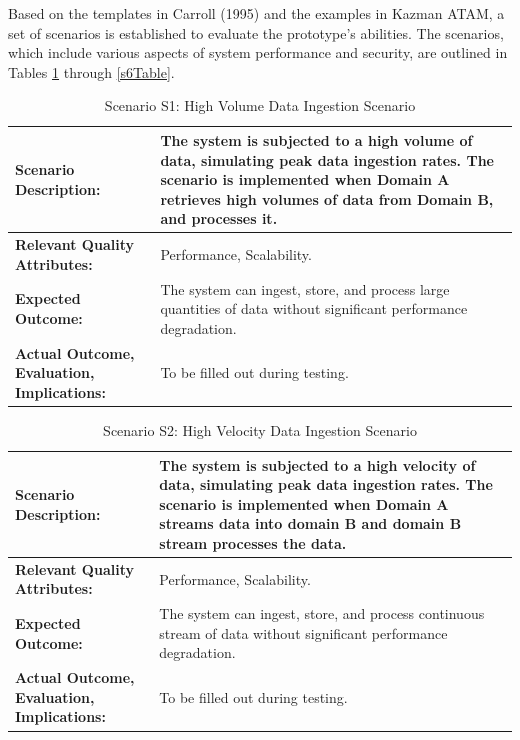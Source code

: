 \documentclass[preprint,12pt]{elsarticle}
\begin{document}
Based on the templates in Carroll (1995) and the examples in Kazman ATAM, a set of scenarios is established to evaluate the prototype's abilities. The scenarios, which include various aspects of system performance and security, are outlined in Tables \ref{s1Table} through \ref{s6Table}.

\begin{table}[tbp]
  \caption{Scenario S1: High Volume Data Ingestion Scenario}
  \begin{tabularx}{\textwidth}{|>{\raggedright\arraybackslash}p{5cm}|X|}
  \hline
  \textbf{Scenario Description:} & The system is subjected to a high volume of data, simulating peak data ingestion rates. The scenario is implemented when Domain A retrieves high volumes of data from Domain B, and processes it.  \\
  \hline
  \textbf{Relevant Quality Attributes:} & Performance, Scalability. \\
  \hline
  \textbf{Expected Outcome:} & The system can ingest, store, and process large quantities of data without significant performance degradation. \\
  \hline
  \textbf{Actual Outcome, Evaluation, Implications:} & To be filled out during testing. \\
  \hline
  \end{tabularx}
  \label{s1Table}
\end{table}

\begin{table}[tbp]
  \caption{Scenario S2: High Velocity Data Ingestion Scenario}
  \begin{tabularx}{\textwidth}{|>{\raggedright\arraybackslash}p{5cm}|X|}
  \hline
  \textbf{Scenario Description:} & The system is subjected to a high velocity of data, simulating peak data ingestion rates. The scenario is implemented when Domain A streams data into domain B and domain B stream processes the data.    \\
  \hline
  \textbf{Relevant Quality Attributes:} & Performance, Scalability. \\
  \hline
  \textbf{Expected Outcome:} & The system can ingest, store, and process continuous stream of data without significant performance degradation. \\
  \hline
  \textbf{Actual Outcome, Evaluation, Implications:} & To be filled out during testing. \\
  \hline
  \end{tabularx}
\end{table}
\end{document}
